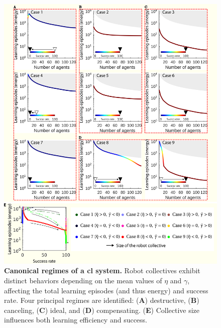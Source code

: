 \documentclass[12pt]{article}
\begin{document}
\begin{figure}[t!]
	\centering
	\hspace*{\fill}
	\includegraphics[width=14cm]{collective_learning_cases_v1.png}
	\hspace*{\fill}
	\caption[] {\label{fig:collective_learning_cases} \textbf{Canonical regimes of a \acl{cl} system.} Robot collectives exhibit distinct behaviors depending on the mean values of $\eta$ and $\gamma$, affecting the total learning episodes (and thus energy) and success rate. Four principal regimes are identified: (\textbf{A}) destructive, (\textbf{B}) canceling, (\textbf{C}) ideal, and (\textbf{D}) compensating. (\textbf{E}) Collective size influences both learning efficiency and success.}
\end{figure}
\end{document}
